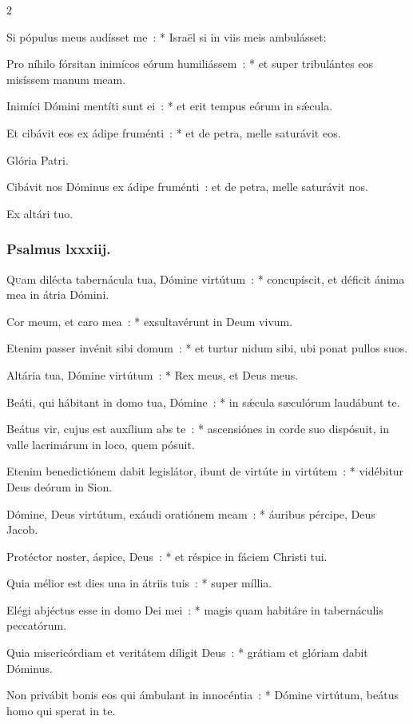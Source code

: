 \documentclass[9pt,twoside]{extarticle}
\begin{document}
\begin{multicols}{2}
{Si pópulus meus audísset me~: * Israël si in viis meis ambulásset:

Pro níhilo fórsitan inimícos eórum humiliássem~: * et super tribulántes eos misíssem manum meam.

Inimíci Dómini mentíti sunt ei~: * et erit tempus eórum in sǽcula.

Et cibávit eos ex ádipe fruménti~: * et de petra, melle saturávit eos.

Glória Patri.

\begin{tightlist}{}
\item {} Cibávit nos Dóminus ex ádipe fruménti~: et de petra, melle saturávit nos.
\item {} Ex altári tuo.
\end{tightlist}

\subsubsection*{\center Psalmus lxxxiij.}
\lettrine{Q}uam dilécta tabernácula tua, Dómine virtútum~: * concupíscit, et déficit ánima mea in átria Dómini.

Cor meum, et caro mea~: * exsultavérunt in Deum vivum.

Etenim passer invénit sibi domum~: * et turtur nidum sibi, ubi ponat pullos suos.

Altária tua, Dómine virtútum~: * Rex meus, et Deus meus.

Beáti, qui hábitant in domo tua, Dómine~: * in sǽcula sæculórum laudábunt te.

Beátus vir, cujus est auxílium abs te~: * ascensiónes in corde suo dispósuit, in valle lacrimárum in loco, quem pósuit.

Etenim benedictiónem dabit legislátor, ibunt de virtúte in virtútem~: * vidébitur Deus deórum in Sion.

Dómine, Deus virtútum, exáudi oratiónem meam~: * áuribus pércipe, Deus Jacob.

Protéctor noster, áspice, Deus~: * et réspice in fáciem Christi tui.

Quia mélior est dies una in átriis tuis~: * super míllia.

Elégi abjéctus esse in domo Dei mei~: * magis quam habitáre in tabernáculis peccatórum.

Quia misericórdiam et veritátem díligit Deus~: * grátiam et glóriam dabit Dóminus.

Non privábit bonis eos qui ámbulant in innocéntia~: * Dómine virtútum, beátus homo qui sperat in te.

}
\end{multicols}
\end{document}
